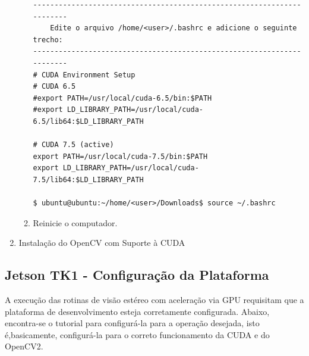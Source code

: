 \begin{enumerate}
\begin{enumerate}
\begin{lstlisting}[basicstyle=\tiny]
-----------------------------------------------------------------------
    Edite o arquivo /home/<user>/.bashrc e adicione o seguinte trecho:
-----------------------------------------------------------------------
# CUDA Environment Setup 
# CUDA 6.5
#export PATH=/usr/local/cuda-6.5/bin:$PATH
#export LD_LIBRARY_PATH=/usr/local/cuda-6.5/lib64:$LD_LIBRARY_PATH

# CUDA 7.5 (active)
export PATH=/usr/local/cuda-7.5/bin:$PATH
export LD_LIBRARY_PATH=/usr/local/cuda-7.5/lib64:$LD_LIBRARY_PATH

$ ubuntu@ubuntu:~/home/<user>/Downloads$ source ~/.bashrc

\end{lstlisting}

\item Reinicie o computador.
 \end{enumerate}
  

  \item Instalação do OpenCV com Suporte à CUDA
\end{enumerate}

\subsection{Jetson TK1 - Configuração da Plataforma}
\label{jetsonSetupCUDA}

A execução das rotinas de visão estéreo com aceleração via GPU requisitam que a plataforma de desenvolvimento esteja corretamente configurada. Abaixo, encontra-se o tutorial para configurá-la para a operação desejada, isto é,basicamente, configurá-la para o correto funcionamento da CUDA e do OpenCV2. 

